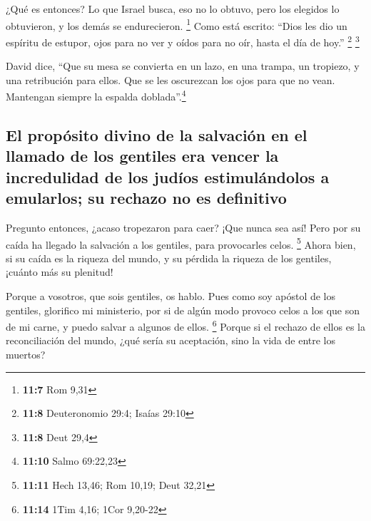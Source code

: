  ¿Qué es entonces? Lo que Israel busca, eso no lo obtuvo,
pero los elegidos lo obtuvieron, y los demás se endurecieron.
\footnote{\textbf{11:7} Rom 9,31}  Como está escrito:
``Dios les dio un espíritu de estupor, ojos para no ver y oídos para no
oír, hasta el día de hoy.'' \footnote{\textbf{11:8} Deuteronomio 29:4;
  Isaías 29:10} \footnote{\textbf{11:8} Deut 29,4}

 David dice, ``Que su mesa se convierta en un lazo, en una
trampa, un tropiezo, y una retribución para ellos.  Que
se les oscurezcan los ojos para que no vean. Mantengan siempre la
espalda doblada''.\footnote{\textbf{11:10} Salmo 69:22,23}

\hypertarget{el-propuxf3sito-divino-de-la-salvaciuxf3n-en-el-llamado-de-los-gentiles-era-vencer-la-incredulidad-de-los-juduxedos-estimuluxe1ndolos-a-emularlos-su-rechazo-no-es-definitivo}{%
\subsection{El propósito divino de la salvación en el llamado de los
gentiles era vencer la incredulidad de los judíos estimulándolos a
emularlos; su rechazo no es
definitivo}\label{el-propuxf3sito-divino-de-la-salvaciuxf3n-en-el-llamado-de-los-gentiles-era-vencer-la-incredulidad-de-los-juduxedos-estimuluxe1ndolos-a-emularlos-su-rechazo-no-es-definitivo}}

 Pregunto entonces, ¿acaso tropezaron para caer? ¡Que
nunca sea así! Pero por su caída ha llegado la salvación a los gentiles,
para provocarles celos. \footnote{\textbf{11:11} Hech 13,46; Rom 10,19;
  Deut 32,21}  Ahora bien, si su caída es la riqueza del
mundo, y su pérdida la riqueza de los gentiles, ¡cuánto más su plenitud!

 Porque a vosotros, que sois gentiles, os hablo. Pues
como soy apóstol de los gentiles, glorifico mi ministerio,
 por si de algún modo provoco celos a los que son de mi
carne, y puedo salvar a algunos de ellos. \footnote{\textbf{11:14} 1Tim
  4,16; 1Cor 9,20-22}  Porque si el rechazo de ellos es
la reconciliación del mundo, ¿qué sería su aceptación, sino la vida de
entre los muertos?

